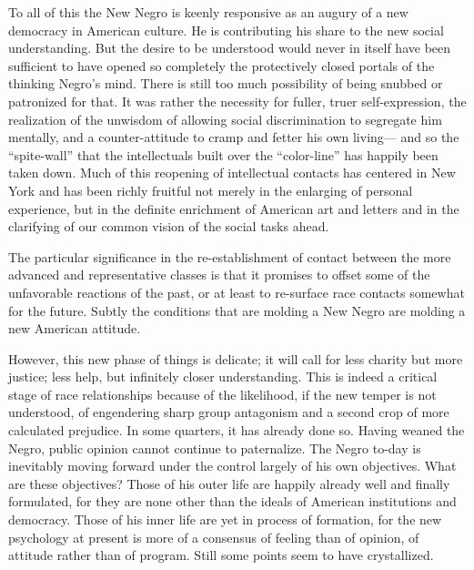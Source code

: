 \documentclass[12pt]{article}
\begin{document}
To all of this the New Negro is keenly responsive as an augury of a new democracy in American culture. He is contributing his share to the new social understanding. But the desire to be understood would never in itself have been sufficient to have opened so completely the protectively closed portals of the thinking Negro's mind. There is still too much possibility of being snubbed or patronized for that. It was rather the necessity for fuller, truer self-expression, the realization of the unwisdom of allowing social discrimination to segregate him mentally, and a counter-attitude to cramp and fetter his own living--- and so the ``spite-wall'' that the intellectuals built over the ``color-line'' has happily been taken down. Much of this reopening of intellectual contacts has centered in New York and has been richly fruitful not merely in the enlarging of personal experience, but in the definite enrichment of American art and letters and in the clarifying of our common vision of the social tasks ahead.

The particular significance in the re-establishment of contact between the more advanced and representative classes is that it promises to offset some of the unfavorable reactions of the past, or at least to re-surface race contacts somewhat for the future. Subtly the conditions that are molding a New Negro are molding a new American attitude.

However, this new phase of things is delicate; it will call for less charity but more justice; less help, but infinitely closer understanding. This is indeed a critical stage of race relationships because of the likelihood, if the new temper is not understood, of engendering sharp group antagonism and a second crop of more calculated prejudice. In some quarters, it has already done so. Having weaned the Negro, public opinion cannot continue to paternalize. The Negro to-day is inevitably moving forward under the control largely of his own objectives. What are these objectives? Those of his outer life are happily already well and finally formulated, for they are none other than the ideals of American institutions and democracy. Those of his inner life are yet in process of formation, for the new psychology at present is more of a consensus of feeling than of opinion, of attitude rather than of program. Still some points seem to have crystallized.
\end{document}
